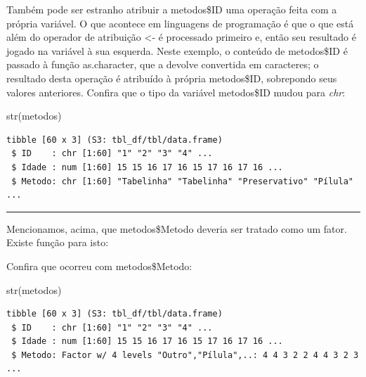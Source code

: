 \documentclass[
]{article}
\newenvironment{Shaded}{\begin{snugshade}}{\end{snugshade}}
\newcommand{\FunctionTok}[1]{\textcolor[rgb]{0.00,0.00,0.00}{#1}}
\newcommand{\NormalTok}[1]{#1}
\newcommand{\OtherTok}[1]{\textcolor[rgb]{0.56,0.35,0.01}{#1}}
\newcommand{\SpecialCharTok}[1]{\textcolor[rgb]{0.00,0.00,0.00}{#1}}
\begin{document}
Também pode ser estranho atribuir a metodos\$ID uma operação feita com a
própria variável. O que acontece em linguagens de programação é que o
que está além do operador de atribuição \textless- é processado primeiro
e, então seu resultado é jogado na variável à sua esquerda. Neste
exemplo, o conteúdo de metodos\$ID é passado à função as.character, que
a devolve convertida em caracteres; o resultado desta operação é
atribuído à própria metodos\$ID, sobrepondo seus valores anteriores.
Confira que o tipo da variável metodos\$ID mudou para \emph{chr}:

\begin{Shaded}
\begin{Highlighting}[]
\FunctionTok{str}\NormalTok{(metodos)}
\end{Highlighting}
\end{Shaded}

\begin{verbatim}
tibble [60 x 3] (S3: tbl_df/tbl/data.frame)
 $ ID    : chr [1:60] "1" "2" "3" "4" ...
 $ Idade : num [1:60] 15 15 16 17 16 15 17 16 17 16 ...
 $ Metodo: chr [1:60] "Tabelinha" "Tabelinha" "Preservativo" "Pílula" ...
\end{verbatim}

\begin{center}\rule{0.5\linewidth}{0.5pt}\end{center}

Mencionamos, acima, que metodos\$Metodo deveria ser tratado como um
fator. Existe função para isto:

\begin{Shaded}
\end{Shaded}

Confira que ocorreu com metodos\$Metodo:

\begin{Shaded}
\begin{Highlighting}[]
\FunctionTok{str}\NormalTok{(metodos)}
\end{Highlighting}
\end{Shaded}

\begin{verbatim}
tibble [60 x 3] (S3: tbl_df/tbl/data.frame)
 $ ID    : chr [1:60] "1" "2" "3" "4" ...
 $ Idade : num [1:60] 15 15 16 17 16 15 17 16 17 16 ...
 $ Metodo: Factor w/ 4 levels "Outro","Pílula",..: 4 4 3 2 2 4 4 3 2 3 ...
\end{verbatim}
\end{document}
